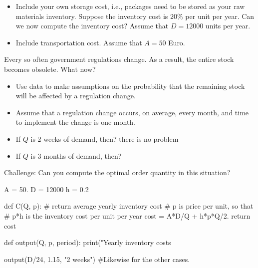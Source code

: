 \begin{exercise}
 \begin{itemize}
 \item Include your own storage cost, i.e., packages need to be
   stored as your raw materials inventory.  Suppose the
   inventory cost is $20\%$ per unit per year. Can we now compute the
   inventory cost?  Assume that $D = 12000$ units per year.
 \item Include transportation cost.  Assume that $A = 50$ Euro.
 \end{itemize}
\end{exercise}

\begin{exercise}
Every so often government regulations change. As a result, the entire
stock becomes obsolete. What now?
\begin{solution}
 \begin{itemize}
 \item Use data to make assumptions on the probability that the
   remaining stock will be affected by a regulation change.
 \item Assume that a regulation change occurs, on average, every
   month, and time to implement the change is one month.
 \item If  $Q$ is 2 weeks of demand, then?  there is no problem
 \item If $Q$ is 3 months of demand, then? 
 \end{itemize}
Challenge: Can you compute the optimal order quantity in this situation? 

  \begin{pyconsole}[eoq]
A = 50.
D = 12000
h = 0.2

def C(Q, p): # return average yearly inventory cost
    # p is price per unit, so that
    # p*h is the inventory cost per unit per year
    cost = A*D/Q + h*p*Q/2.
    return cost

def output(Q, p, period):
    print("Yearly inventory costs %

output(D/24, 1.15, "2 weeks")
#Likewise for the other cases.
  \end{pyconsole}



\end{solution}
\end{exercise}
